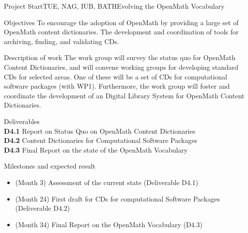 \documentclass{euproposal}
\begin{document}
\begin{workpackage}{36}{4}{Project Start}{TUE, NAG, IUB, BATH}{Evolving the OpenMath Vocabulary} 
\begin{wpbox}{Objectives}
  To encourage the adoption of OpenMath by providing a large set of OpenMath
  content dictionaries. The development and coordination of tools for archiving,
  finding, and validating CDs.
\end{wpbox}
\begin{wpbox}{Description of work}
  The work group will survey the status quo for OpenMath Content Dictionaries, and
  will convene working groups for developing standard CDs for selected areas. One
  of these will be a set of CDs for computational software packages (with WP1).
  Furthermore, the work group will foster and coordinate the development of an
  Digital Library System for OpenMath Content Dictionaries.
\end{wpbox}
\begin{wpbox}{Deliverables\\}
{\bf D4.1} Report on Status Quo on OpenMath Content Dictionaries\\
{\bf D4.2} Content Dictionaries for Computational Software Packages\\
{\bf D4.3} Final Report on the state of the OpenMath Vocabulary\\
\end{wpbox}
\begin{wpbox}{Milestones and expected result}
\begin{itemize}
\item (Month 3) Assessment of the current state (Deliverable D4.1)
\item (Month 24) First draft for CDs for computational Software Packages
  (Deliverable D4.2)
\item (Month 34) Final Report on the OpenMath Vocabulary (D4.3)
\end{itemize}
\end{wpbox}
\end{workpackage}
\newpage
\end{document}
